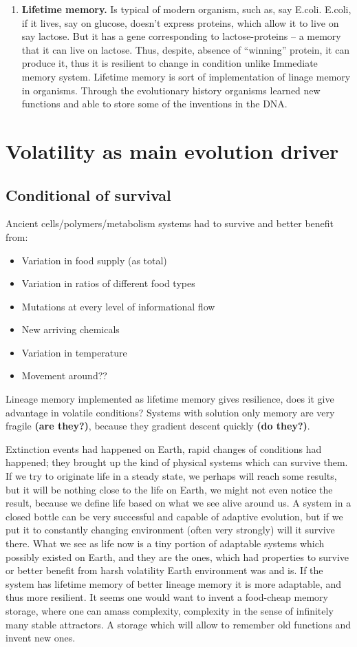 \documentclass[12pt]{paper}
\begin{document}
\begin{enumerate}
 \item \textbf{Lifetime memory.} Is typical of modern organism, such as, say E.coli. E.coli, if it 
lives, say on glucose, doesn't express proteins, which allow it to live on say lactose. But it has 
a gene corresponding to lactose-proteins -- a memory that it can live on lactose. Thus, despite, 
absence of ``winning'' protein, it can produce it, thus it is resilient to change in condition 
unlike Immediate memory system. Lifetime memory is sort of implementation of linage memory in 
organisms. Through the evolutionary history organisms learned new functions and able to store some 
of the inventions in the DNA.
\end{enumerate}


\section{Volatility as main evolution driver}
\subsection{Conditional of survival}
Ancient cells/polymers/metabolism systems had to survive and better benefit from:
\begin{itemize}
 \item Variation in food supply (as total)
 \item Variation in ratios of different food types
 \item Mutations at every level of informational flow
 \item New arriving chemicals
 \item Variation in temperature
 \item Movement around??
\end{itemize}
Lineage memory implemented as lifetime memory gives resilience, does it give advantage in volatile 
conditions? 
Systems with solution only memory are very fragile \textbf{(are they?)}, because they gradient 
descent quickly \textbf{(do they?)}. 

Extinction events had happened on Earth, rapid changes of conditions had happened; they brought up 
the kind of physical systems which can survive them. If we try to originate life in a steady state, 
we perhaps will reach some results, but it will be nothing close to the life on Earth, we might not 
even notice the result, because we define life based on what we see alive around us. A system in a 
closed bottle can be very successful and capable of adaptive evolution, but if we put it to 
constantly changing environment (often very strongly) will it survive there. What we see as life 
now is a tiny portion of adaptable systems which possibly existed on Earth, and they are the ones, 
which had properties to survive or better benefit from harsh volatility Earth environment was and 
is. 
If the system has lifetime memory of better lineage memory it is more adaptable, and thus more 
resilient. It seems one would want to invent a food-cheap memory storage, where one can amass 
complexity, complexity in the sense of infinitely many stable attractors. A storage which will 
allow to remember old functions and invent new ones.
\end{document}
